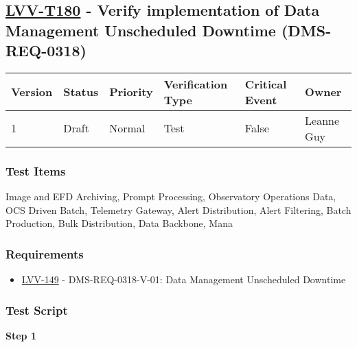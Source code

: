 \hypertarget{lvv-t180---verify-implementation-of-data-management-unscheduled-downtime-dms-req-0318}{%
\subsection{\texorpdfstring{\href{https://jira.lsstcorp.org/secure/Tests.jspa\#/testCase/LVV-T180}{LVV-T180}
- Verify implementation of Data Management Unscheduled Downtime
(DMS-REQ-0318)}{LVV-T180 - Verify implementation of Data Management Unscheduled Downtime (DMS-REQ-0318)}}\label{lvv-t180---verify-implementation-of-data-management-unscheduled-downtime-dms-req-0318}}

\begin{longtable}[]{@{}llllll@{}}
\toprule
Version & Status & Priority & Verification Type & Critical Event &
Owner\tabularnewline
\midrule
\endhead
1 & Draft & Normal & Test & False & Leanne Guy\tabularnewline
\bottomrule
\end{longtable}

\hypertarget{test-items-80}{%
\subsubsection{Test Items}\label{test-items-80}}

Image and EFD Archiving, Prompt Processing, Observatory Operations Data,
OCS Driven Batch, Telemetry Gateway, Alert Distribution, Alert
Filtering, Batch Production, Bulk Distribution, Data Backbone, Mana

\hypertarget{requirements-80}{%
\subsubsection{Requirements}\label{requirements-80}}

\begin{itemize}
\tightlist
\item
  \href{https://jira.lsstcorp.org/browse/LVV-149}{LVV-149} -
  DMS-REQ-0318-V-01: Data Management Unscheduled Downtime
\end{itemize}

\hypertarget{test-script-80}{%
\subsubsection{Test Script}\label{test-script-80}}

\textbf{Step 1}\\
~\\
~\\

